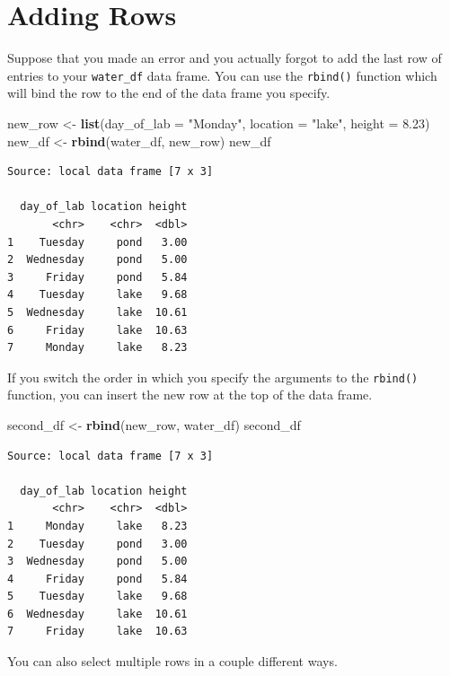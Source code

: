 \documentclass[twoside, 12pt]{article}
\newenvironment{Shaded}{\begin{snugshade}}{\end{snugshade}}
\newcommand{\KeywordTok}[1]{\textcolor[rgb]{0.13,0.29,0.53}{\textbf{{#1}}}}
\newcommand{\DataTypeTok}[1]{\textcolor[rgb]{0.13,0.29,0.53}{{#1}}}
\newcommand{\FloatTok}[1]{\textcolor[rgb]{0.00,0.00,0.81}{{#1}}}
\newcommand{\StringTok}[1]{\textcolor[rgb]{0.31,0.60,0.02}{{#1}}}
\newcommand{\NormalTok}[1]{{#1}}
\newcommand{\nonumsection}[1]{
  \addtocontents{toc}{\protect\setcounter{tocdepth}{-1}}
  \section{#1}
  \addtocontents{toc}{\protect\setcounter{tocdepth}{1}}
}
\begin{document}
\nonumsection{Adding Rows}

Suppose that you made an error and you actually forgot to add the last
row of entries to your \texttt{water\_df} data frame. You can use the
\texttt{rbind()} function which will bind the row to the end of the data
frame you specify.

\begin{Shaded}
\begin{Highlighting}[]
\NormalTok{new_row <-}\StringTok{ }\KeywordTok{list}\NormalTok{(}\DataTypeTok{day_of_lab =} \StringTok{"Monday"}\NormalTok{, }\DataTypeTok{location =} \StringTok{"lake"}\NormalTok{, }
                \DataTypeTok{height =} \FloatTok{8.23}\NormalTok{)}
\NormalTok{new_df <-}\StringTok{ }\KeywordTok{rbind}\NormalTok{(water_df, new_row)}
\NormalTok{new_df}
\end{Highlighting}
\end{Shaded}

\begin{Verbatim}[frame=single]
Source: local data frame [7 x 3]

  day_of_lab location height
       <chr>    <chr>  <dbl>
1    Tuesday     pond   3.00
2  Wednesday     pond   5.00
3     Friday     pond   5.84
4    Tuesday     lake   9.68
5  Wednesday     lake  10.61
6     Friday     lake  10.63
7     Monday     lake   8.23
\end{Verbatim}

If you switch the order in which you specify the arguments to the
\texttt{rbind()} function, you can insert the new row at the top of the
data frame.

\begin{Shaded}
\begin{Highlighting}[]
\NormalTok{second_df <-}\StringTok{ }\KeywordTok{rbind}\NormalTok{(new_row, water_df)}
\NormalTok{second_df}
\end{Highlighting}
\end{Shaded}

\begin{Verbatim}[frame=single]
Source: local data frame [7 x 3]

  day_of_lab location height
       <chr>    <chr>  <dbl>
1     Monday     lake   8.23
2    Tuesday     pond   3.00
3  Wednesday     pond   5.00
4     Friday     pond   5.84
5    Tuesday     lake   9.68
6  Wednesday     lake  10.61
7     Friday     lake  10.63
\end{Verbatim}

You can also select multiple rows in a couple different ways.
\end{document}

